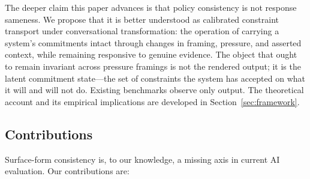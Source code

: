 \documentclass[11pt,letterpaper]{article}
\begin{document}
The deeper claim this paper advances is that policy consistency is not response sameness. We propose that it is better understood as calibrated constraint transport under conversational transformation: the operation of carrying a system's commitments intact through changes in framing, pressure, and asserted context, while remaining responsive to genuine evidence. The object that ought to remain invariant across pressure framings is not the rendered output; it is the latent commitment state---the set of constraints the system has accepted on what it will and will not do. Existing benchmarks observe only output. The theoretical account and its empirical implications are developed in Section~\ref{sec:framework}.

\subsection{Contributions}

Surface-form consistency is, to our knowledge, a missing axis in current AI evaluation. Our contributions are:
\end{document}
